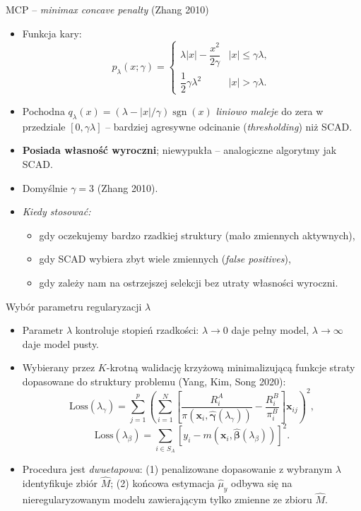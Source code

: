 \documentclass[10pt,ignorenonframetext, aspectratio=169]{beamer}
\newcommand{\bx}{\boldsymbol{x}}
\newcommand{\bbeta}{\boldsymbol{\beta}}
\newcommand{\bgamma}{\boldsymbol{\gamma}}
\begin{document}
\begin{frame}{MCP -- \emph{minimax concave penalty} (Zhang 2010)}
\begin{itemize}
\justifying
    \item Funkcja kary:
    \begin{equation*}
        p_{\lambda}(x; \gamma) = \begin{cases} \lambda|x| - \dfrac{x^2}{2\gamma} & |x| \leq \gamma\lambda, \\ \dfrac{1}{2}\gamma\lambda^2 & |x| > \gamma\lambda. \end{cases}
    \end{equation*}
    \item Pochodna $q_\lambda(x) = \left(\lambda - |x|/\gamma\right)\operatorname{sgn}(x)$ \emph{liniowo maleje} do zera w przedziale $[0, \gamma\lambda]$ -- bardziej agresywne odcinanie (\emph{thresholding}) niż SCAD.
    \item \textbf{Posiada własność wyroczni}; niewypukła -- analogiczne algorytmy jak SCAD.
    \item Domyślnie $\gamma=3$ (Zhang 2010).
    \item \emph{Kiedy stosować:}
    \begin{itemize}
        \item gdy oczekujemy bardzo rzadkiej struktury (mało zmiennych aktywnych),
        \item gdy SCAD wybiera zbyt wiele zmiennych (\emph{false positives}),
        \item gdy zależy nam na ostrzejszej selekcji bez utraty własności wyroczni.
    \end{itemize}
\end{itemize}
\end{frame}

\begin{frame}{Wybór parametru regularyzacji $\lambda$}
\begin{itemize}
\justifying
    \item Parametr $\lambda$ kontroluje stopień rzadkości: $\lambda \to 0$ daje pełny model, $\lambda \to \infty$ daje model pusty.
    \item Wybierany przez $K$-krotną walidację krzyżową minimalizującą funkcje straty dopasowane do struktury problemu (Yang, Kim, Song 2020):
    \begin{equation*}
        \text{Loss}(\lambda_\gamma) = \sum_{j=1}^{p}\left(\sum_{i=1}^{N}\left[\frac{R_i^A}{\pi(\bx_i, \hat{\bgamma}(\lambda_\gamma))} - \frac{R_i^B}{\pi_i^B}\right] \bx_{ij}\right)^{\!2},
    \end{equation*}
    \begin{equation*}
        \text{Loss}(\lambda_\beta) = \sum_{i \in S_A}\left[y_i - m(\bx_i, \hat{\bbeta}(\lambda_\beta))\right]^{2}.
    \end{equation*}
    \item Procedura jest \emph{dwuetapowa}: (1) penalizowane dopasowanie z wybranym $\lambda$ identyfikuje zbiór $\hat{M}$; (2) końcowa estymacja $\hat{\mu}_y$ odbywa się na nieregularyzowanym modelu zawierającym tylko zmienne ze zbioru $\hat{M}$.
\end{itemize}
\end{frame}
\end{document}
